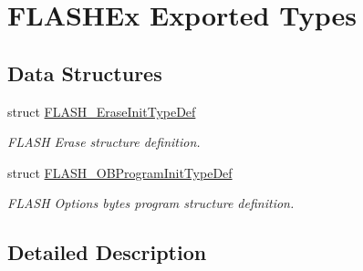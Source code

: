 \hypertarget{group___f_l_a_s_h_ex___exported___types}{}\section{F\+L\+A\+S\+H\+Ex Exported Types}
\label{group___f_l_a_s_h_ex___exported___types}
\subsection*{Data Structures}
\begin{DoxyCompactItemize}
\item 
struct \hyperlink{struct_f_l_a_s_h___erase_init_type_def}{F\+L\+A\+S\+H\+\_\+\+Erase\+Init\+Type\+Def}
\begin{DoxyCompactList}\small\item\em F\+L\+A\+SH Erase structure definition. \end{DoxyCompactList}\item 
struct \hyperlink{struct_f_l_a_s_h___o_b_program_init_type_def}{F\+L\+A\+S\+H\+\_\+\+O\+B\+Program\+Init\+Type\+Def}
\begin{DoxyCompactList}\small\item\em F\+L\+A\+SH Options bytes program structure definition. \end{DoxyCompactList}\end{DoxyCompactItemize}


\subsection{Detailed Description}
